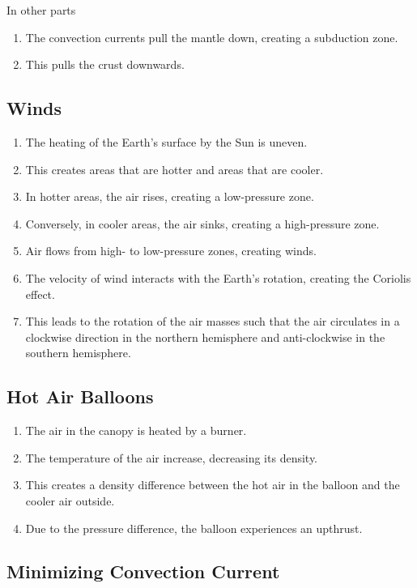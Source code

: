 \documentclass[a4paper,12pt]{article}
\begin{document}
In other parts
\begin{enumerate}
  \item The convection currents pull the mantle down, creating a subduction zone.
  \item This pulls the crust downwards.
\end{enumerate}

\subsection{Winds}

\begin{enumerate}
  \item The heating of the Earth's surface by the Sun is uneven.
  \item This creates areas that are hotter and areas that are cooler.
  \item In hotter areas, the air rises, creating a low-pressure zone.
  \item Conversely, in cooler areas, the air sinks, creating a high-pressure zone.
  \item Air flows from high- to low-pressure zones, creating winds.
  \item The velocity of wind interacts with the Earth's rotation, creating the Coriolis effect.
  \item This leads to the rotation of the air masses such that the air circulates in a clockwise direction in the northern hemisphere and anti-clockwise in the southern hemisphere.
\end{enumerate}

\pagebreak

\subsection{Hot Air Balloons}

\begin{enumerate}
  \item The air in the canopy is heated by a burner.
  \item The temperature of the air increase, decreasing its density.
  \item This creates a density difference between the hot air in the balloon and the cooler air outside.
  \item Due to the pressure difference, the balloon experiences an upthrust.
\end{enumerate}

\subsection{Minimizing Convection Current}
\end{document}
